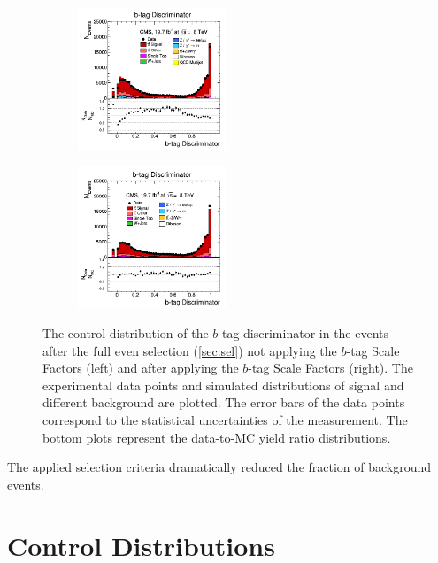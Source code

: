 \begin{itemize}
 \begin{figure}[h]
 \centering
 \begin{subfigure}
   \centering
   \includegraphics[width=0.49\textwidth]{04_event_reconstruction/plots/bTagDiscr_step6.png}
 \end{subfigure}
 \begin{subfigure}
   \centering
   \includegraphics[width=0.49\textwidth]{04_event_reconstruction/plots/bTagDiscr_step7.png}
 \end{subfigure}
 \caption{The control distribution of the $b$-tag discriminator in the events after the full even selection (\ref{sec:sel}) not applying the $b$-tag Scale Factors (left)
 and after applying the $b$-tag Scale Factors (right). The experimental data points and simulated distributions of signal and different background are plotted.
 The error bars of the data points correspond to the statistical uncertainties of the measurement.
 The bottom plots represent the data-to-MC yield ratio distributions.}
 \label{fig:bTagDiscr}
 \end{figure}
 \end{itemize}

The applied selection criteria dramatically reduced the fraction of background events.

\section{Control Distributions}

